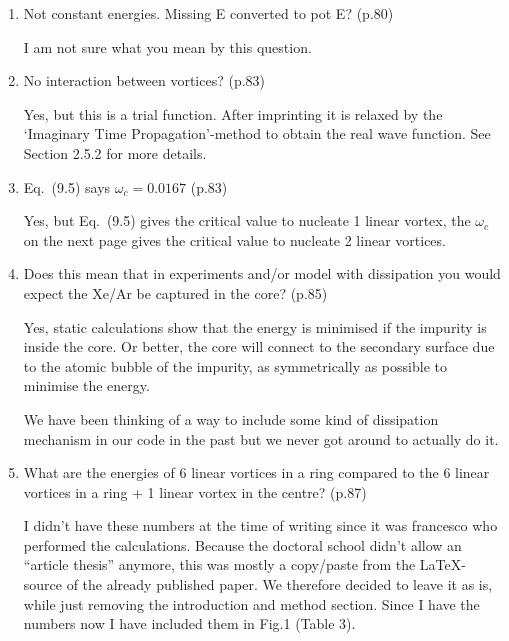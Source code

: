 \documentclass[11pt]{revtex4-1}
\newenvironment{QandA}{\begin{enumerate}[label=\bfseries\arabic*)]\bfseries}
                      {\end{enumerate}}
\newenvironment{answered}{\par\normalfont}{}
\begin{document}
\begin{QandA}
\begin{answered}
			On the other hand, in Refs.~\citep{Kwon12,Shin12} where they did a PIMC study on the fullerenes C$_{20}$ and C$_{60}$ they found that in some cases the local superfluid fraction is completely suppressed for sizes that promote a solid-like order of the $^4$He atoms that is commensurate with the lattice of the fullerene surface.
		\end{answered}
		
		\item Not constant energies. Missing E converted to pot E? (p.80)
		\begin{answered}
			I am not sure what you mean by this question.
		\end{answered}
		
		\item No interaction between vortices? (p.83)
		\begin{answered} 
				Yes, but this is a trial function. After imprinting it is relaxed by the `Imaginary Time Propagation'-method to obtain the real wave function. See Section 2.5.2 for more details.
		\end{answered}
		
		\item Eq.~(9.5) says $\omega_c=0.0167$ (p.83)
		\begin{answered}
			Yes, but Eq.~(9.5) gives the critical value to nucleate 1 linear vortex, the $\omega_c$ on the next page gives the critical value to nucleate 2 linear vortices.
		\end{answered}
		
		\item Does this mean that in experiments and/or model with dissipation you would expect the Xe/Ar be captured in the core? (p.85)
		\begin{answered}
			Yes, static calculations show that the energy is minimised if the impurity is inside the core. Or better, the core will connect to the secondary surface due to the atomic bubble of the impurity, as symmetrically as possible to minimise the energy.
			
			We have been thinking of a way to include some kind of dissipation mechanism in our code in the past but we never got around to actually do it.
		\end{answered}
		
		\item What are the energies of 6 linear vortices in a ring compared to the 6 linear vortices in a ring + 1 linear vortex in the centre? (p.87)
		\begin{answered}
			I didn’t have these numbers at the time of writing since it was francesco who performed the calculations. Because the doctoral school didn't allow an ``article thesis'' anymore, this was mostly a copy/paste from the \LaTeX-source of the already published paper. We therefore decided to leave it as is, while just removing the introduction and method section. Since I have the numbers now I have included them in Fig.1 (Table 3).
		\end{answered}


\end{QandA}
\end{document}
